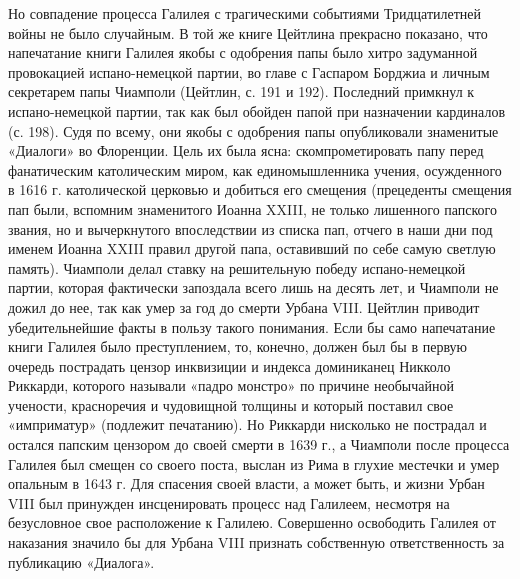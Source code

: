 Но совпадение процесса Галилея с трагическими событиями Тридцатилетней
войны не было  случайным. В той же книге  Цейтлина прекрасно показано,
что  напечатание  книги Галилея  якобы  с  одобрения папы  было  хитро
задуманной  провокацией испано-немецкой  партии, во  главе с  Гаспаром
Борджиа и  личным секретарем  папы Чиамполи (Цейтлин,  с. 191  и 192).
Последний примкнул к испано-немецкой партии, так как был обойден папой
при  назначении  кардиналов (с.  198).  Судя  по  всему, они  якобы  с
одобрения папы опубликовали знаменитые «Диалоги» во Флоренции. Цель их
была  ясна:  скомпрометировать  папу перед  фанатическим  католическим
миром, как единомышленника учения,  осужденного в 1616 г. католической
церковью  и  добиться  его  смещения (прецеденты  смещения  пап  были,
вспомним  знаменитого  Иоанна  XXIII,  не  только  лишенного  папского
звания, но  и вычеркнутого впоследствии  из списка пап, отчего  в наши
дни под  именем Иоанна  XXIII правил другой  папа, оставивший  по себе
самую  светлую память).  Чиамполи делал  ставку на  решительную победу
испано-немецкой  партии, которая  фактически запоздала  всего лишь  на
десять  лет,  и  Чиамполи  не  дожил  до нее,  так  как  умер  за  год
до  смерти  Урбана  VIII.  Цейтлин приводит  убедительнейшие  факты  в
пользу такого понимания.  Если бы само напечатание  книги Галилея было
преступлением, то, конечно, должен был  бы в первую очередь пострадать
цензор  инквизиции и  индекса доминиканец  Никколо Риккарди,  которого
называли «падро монстро» по  причине необычайной учености, красноречия
и чудовищной  толщины и  который поставил свое  «имприматур» (подлежит
печатанию).  Но  Риккарди нисколько  не  пострадал  и остался  папским
цензором до своей смерти в 1639  г., а Чиамполи после процесса Галилея
был смещен  со своего поста, выслан  из Рима в глухие  местечки и умер
опальным в  1643 г. Для спасения  своей власти, а может  быть, и жизни
Урбан VIII был принужден  инсценировать процесс над Галилеем, несмотря
на  безусловное свое  расположение  к  Галилею. Совершенно  освободить
Галилея от наказания  значило бы для Урбана  VIII признать собственную
ответственность за публикацию «Диалога».

